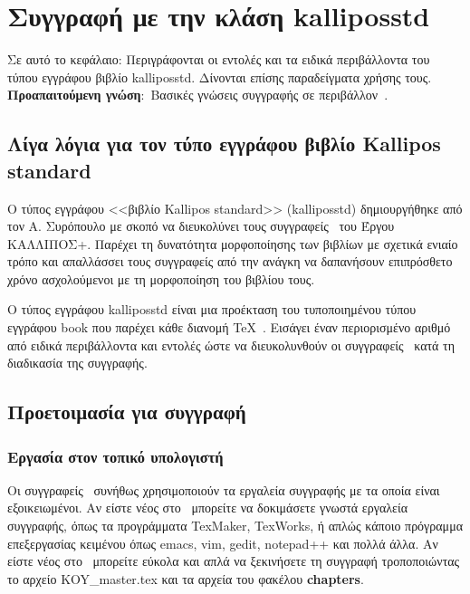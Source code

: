 \chapter{Συγγραφή με την κλάση kalliposstd }\label{chap:kallipos-std}
\begin{refsection}
\begin{summary}{Σε αυτό το κεφάλαιο:}
Περιγράφονται οι εντολές και τα ειδικά περιβάλλοντα του τύπου εγγράφου βιβλίο kalliposstd. Δίνονται επίσης παραδείγματα χρήσης τους. \\
\textbf{Προαπαιτούμενη γνώση}:~Βασικές γνώσεις συγγραφής σε περιβάλλον~\XeLaTeX.
\end{summary}
\section{Λίγα λόγια για τον τύπο εγγράφου βιβλίο Kallipos standard}
Ο τύπος εγγράφου <<βιβλίο Kallipos standard>> (kalliposstd) δημιουργήθηκε από τον Α. Συρόπουλο με σκοπό να διευκολύνει τους συγγραφείς \XeLaTeX\ του Έργου ΚΑΛΛΙΠΟΣ+. Παρέχει τη δυνατότητα μορφοποίησης των βιβλίων με σχετικά ενιαίο τρόπο και απαλλάσσει τους συγγραφείς από την ανάγκη να δαπανήσουν επιπρόσθετο χρόνο ασχολούμενοι με τη μορφοποίηση του βιβλίου τους.

Ο τύπος εγγράφου kalliposstd είναι μια προέκταση του τυποποιημένου τύπου εγγράφου book που παρέχει κάθε διανομή \TeX~. Εισάγει έναν περιορισμένο αριθμό από ειδικά περιβάλλοντα και εντολές ώστε να διευκολυνθούν οι συγγραφείς \XeLaTeX\ κατά τη διαδικασία της συγγραφής.

\section{Προετοιμασία για συγγραφή}

\subsection{Εργασία στον τοπικό υπολογιστή}
Οι συγγραφείς \XeLaTeX\ συνήθως χρησιμοποιούν τα εργαλεία συγγραφής με τα οποία είναι εξοικειωμένοι. Αν
είστε νέος στο \XeLaTeX\ μπορείτε να δοκιμάσετε γνωστά εργαλεία συγγραφής, όπως τα προγράμματα TexMaker, TexWorks, ή απλώς κάποιο πρόγραμμα επεξεργασίας κειμένου όπως emacs, vim, gedit, notepad++ και πολλά άλλα. Αν είστε νέος στο \XeLaTeX\ μπορείτε εύκολα και απλά να ξεκινήσετε τη συγγραφή τροποποιώντας το αρχείο KOY\_master.tex και τα αρχεία του φακέλου \textbf{chapters}.


\end{refsection}
